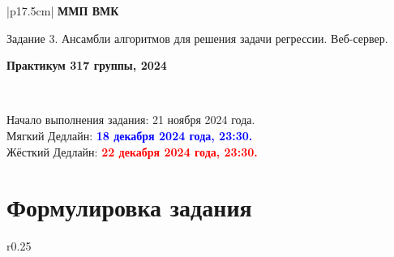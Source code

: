 \documentclass[10pt,fleqn]{article}
\begin{document}
\begin{center}
    \begin{tabular}{|p{17.5cm}|}
        \hline
        \textbf{ММП ВМК}\\
        \begin{center} \Large Задание 3. Ансамбли алгоритмов для решения задачи регрессии. Веб-сервер. \end{center}
        \textbf{Практикум 317 группы, 2024}\\
        \hline
    \end{tabular}
\end{center}

\

\begin{tabbing}
    Начало выполнения задания: 21 ноября 2024 года.\\
    Мягкий Дедлайн: \textcolor{blue}{\bf 18 декабря 2024 года, 23:30.} \\
    Жёсткий Дедлайн: \textcolor{red}{\bf 22 декабря 2024 года, 23:30.}
\end{tabbing}

\section*{Формулировка задания}

\begin{wrapfigure}[15]{r}{0.25\linewidth}
    \begin{center}
        \begin{minipage}[b]{0.8\textwidth}
            \renewcommand*\DTstylecomment{\color{blue}}
            \renewcommand*\DTstyle{\ttfamily\textcolor{red}}
        \end{minipage}
    \end{center}
    \caption{\label{fig:ensembles}Структура шаблона.}
\end{wrapfigure}
\end{document}
